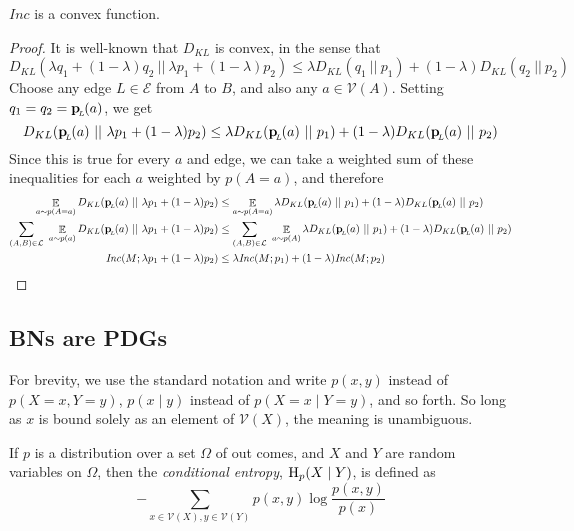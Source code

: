 \documentclass{article}
\newcommand{\bp}[1][L]{\mat{p}_{\!_#1\!}}
\newcommand{\V}{\mathcal V}
\newcommand{\Ed}{\mathcal E}
\newcommand\inconsist{\mathit{Inc}}
\numberwithin{equation}{section}
\begin{document}
	
	\begin{lemma}%
		$\inconsist$ is a convex function. %
	\end{lemma}
	\begin{proof}
		It is well-known that $D_{KL}$ is convex, in the sense that 
		\[ D_{KL}(\lambda q_1 + (1-\lambda) q_2 \ ||\ \lambda p_1 + (1-\lambda) p_2) \leq \lambda D_{KL} (q_1\ ||\ p_1) + (1-\lambda) D_{KL}(q_2\ ||\ p_2) \]
		Choose any edge $L \in \Ed$ from $A$ to $B$, and also any $a \in \mathcal V(A)$. 
		Setting $q_1 = q_2 = \bp(a)$, we get
		\[ D_{KL}(\bp(a) \ ||\ \lambda p_1 + (1-\lambda) p_2) \leq \lambda D_{KL} (\bp(a) \ ||\ p_1) + (1-\lambda) D_{KL}(\bp(a)\ ||\ p_2) \]
		Since this is true for every $a$ and edge, we can take a weighted sum of these inequalities for each $a$ weighted by $p(A=a)$, and therefore
		\begin{align*}
			\E_{a\sim p(A=a)} D_{KL}(\bp(a) \ ||\ \lambda p_1 + (1-\lambda) p_2) &\leq \E_{a\sim p(A=a)}\lambda D_{KL} (\bp(a) \ ||\ p_1) + (1-\lambda) D_{KL}(\bp(a)\ ||\ p_2) \\
			\sum_{(A, B) \in \cal L}~\E_{a\sim p(a)} D_{KL}(\bp(a) \ ||\ \lambda p_1 + (1-\lambda) p_2) &\leq \sum_{(A, B) \in \cal L}~\E_{a\sim p(A)}\lambda D_{KL} (\bp(a) \ ||\ p_1) + (1-\lambda) D_{KL}(\bp(a)\ ||\ p_2) \\
			\inconsist(M ; \lambda p_1 + (1-\lambda)p_2) &\leq \lambda \inconsist(M;p_1) + (1-\lambda) \inconsist(M;p_2)
		\end{align*}
	\end{proof}

\subsection*{BNs are PDGs}

For brevity, we use the standard notation and write $p(x, y)$ instead of $p(X \!=\! x, Y \!=\! y)$, $p(x \mid y)$ instead of $p(X \!=\! x\mid Y \!=\! y)$, and so forth. So long as $x$ is bound solely as an element of $\V(X)$, the meaning is unambiguous. 


\begin{defn}
	If $p$ is a distribution over a set $\Omega$ of out comes, and $X$ and $Y$ are random variables on $\Omega$, then the \emph{conditional entropy}, $\mathrm{H}_p(X \mid Y)$, is defined as 
	\[ - \sum_{x \in \V(X), y \in \V(Y)} p(x,y) \log \frac{p(x,y)}{p(x)} \]
\end{defn}
\end{document}
